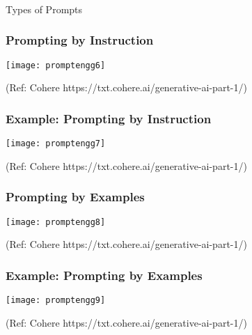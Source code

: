 
\begin{frame}[fragile]\frametitle{}
\begin{center}
{\Large Types of Prompts}
\end{center}
\end{frame}


\begin{frame}[fragile]\frametitle{Prompting by Instruction}

\begin{center}
\texttt{[image: promptengg6]}

{\tiny (Ref: Cohere https://txt.cohere.ai/generative-ai-part-1/)}

\end{center}		
		


\end{frame}

\begin{frame}[fragile]\frametitle{Example: Prompting by Instruction}

\begin{center}
\texttt{[image: promptengg7]}

{\tiny (Ref: Cohere https://txt.cohere.ai/generative-ai-part-1/)}

\end{center}		
		


\end{frame}

\begin{frame}[fragile]\frametitle{Prompting by Examples}

\begin{center}
\texttt{[image: promptengg8]}

{\tiny (Ref: Cohere https://txt.cohere.ai/generative-ai-part-1/)}

\end{center}		
		


\end{frame}

\begin{frame}[fragile]\frametitle{Example: Prompting by Examples}

\begin{center}
\texttt{[image: promptengg9]}

{\tiny (Ref: Cohere https://txt.cohere.ai/generative-ai-part-1/)}

\end{center}		
		
\end{frame}

